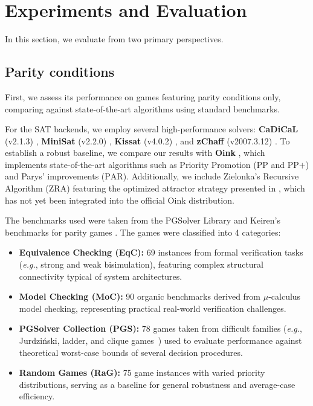 \documentclass[runningheads]{llncs}
\begin{document}

\section{Experiments and Evaluation}\label{sec:experiments}

In this section, we evaluate \nocq from two primary perspectives.

\subsection{Parity conditions}\label{sec:experiments-parity}

First, we assess its performance on games featuring parity conditions only, comparing \nocq against state-of-the-art algorithms using standard benchmarks.

For the SAT backends, we employ several high-performance solvers: \textbf{CaDiCaL} (v2.1.3) \cite{Biere:Cadical:2024}, \textbf{MiniSat} (v2.2.0) \cite{Een:MiniSat:2003}, \textbf{Kissat} (v4.0.2) \cite{Biere:Kissat:2024}, and \textbf{zChaff} (v2007.3.12) \cite{Moskewicz:zChaff:2001}. To establish a robust baseline, we compare our results with \textbf{Oink} \cite{vanDijk:2018}, which implements state-of-the-art algorithms such as Priority Promotion ($\text{PP}$ and $\text{PP+}$) and Parys' improvements ($\text{PAR}$). Additionally, we include Zielonka's Recursive Algorithm ($\text{ZRA}$) featuring the optimized attractor strategy presented in \cite{Aggarwal:2023}, which has not yet been integrated into the official Oink distribution.

The benchmarks used were taken from the PGSolver Library \cite{Friedmann:2017} and Keiren's benchmarks for parity games \cite{Keiren:2015}. The games were classified into 4 categories:

\begin{itemize}
\item \textbf{Equivalence Checking (EqC):} 69 instances from formal verification tasks ({\em e.g.}, strong and weak bisimulation), featuring complex structural connectivity typical of system architectures.
\item \textbf{Model Checking (MoC):} 90 organic benchmarks derived from $\mu$-calculus model checking, representing practical real-world verification challenges.
\item \textbf{PGSolver Collection (PGS):} 78 games taken from difficult families ({\em e.g.}, Jurdziński, ladder, and clique games~\cite{Benerecetti:2016}) used to evaluate performance against theoretical worst-case bounds of several decision procedures.
\item \textbf{Random Games (RaG):} 75 game instances with varied priority distributions, serving as a baseline for general robustness and average-case efficiency.
\end{itemize}
\end{document}
